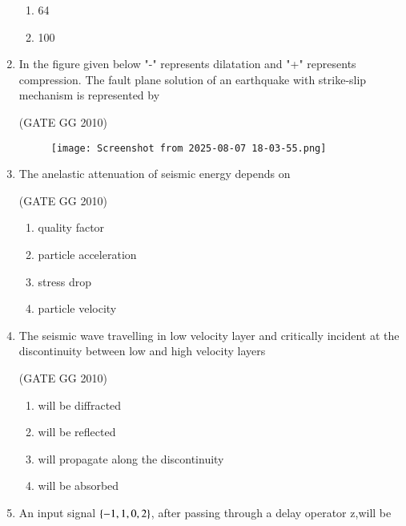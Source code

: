 \documentclass[journal]{IEEEtran}
\begin{document}
\begin{enumerate}[start=26]
\begin{enumerate}
\item 64

\item 100
\end{enumerate}

\item In the figure given below "-" represents dilatation and "+" represents compression. The fault plane solution of an earthquake with strike-slip mechanism is represented by

\hfill{(GATE GG 2010)}

\begin{figure}[H]
    \centering
    \texttt{[image: Screenshot from 2025-08-07 18-03-55.png]} 
    \caption{}
    \label{fig:}
\end{figure}
\begin{enumerate}
\end{enumerate}

\item  The anelastic attenuation of seismic energy depends on

\hfill{(GATE GG 2010)}

\begin{enumerate}
    \item  quality factor
\item  particle acceleration
\item stress drop
\item  particle velocity
\end{enumerate}
 \item The seismic wave travelling in low velocity layer and critically incident at the discontinuity between low and high velocity layers
 
 \hfill{(GATE GG 2010)}
 
\begin{enumerate}
    \item  will be diffracted
\item  will be reflected
\item  will propagate along the discontinuity
\item will be absorbed
\end{enumerate}

\item An input signal $\left\{-1,1,0,2\right\}$, after passing through a delay 
operator z,will be\\


\end{enumerate}
\end{document}
